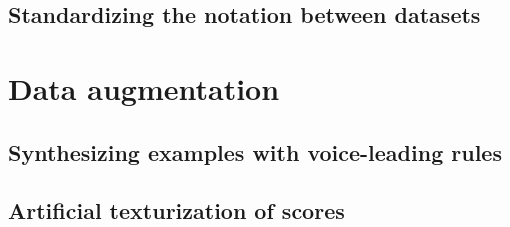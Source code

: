 \subsection{Standardizing the notation between datasets}

\section{Data augmentation}
\subsection{Synthesizing examples with voice-leading rules}
\subsection{Artificial texturization of scores}

